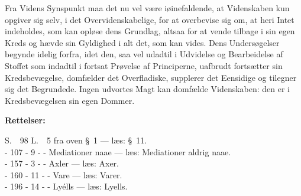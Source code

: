 \documentclass[12pt]{book}
\begin{document}
Fra Videns Synspunkt maa det nu vel være iøinefaldende, at Videnskaben kun
opgiver sig selv, i det Overvidenskabelige, for at overbevise sig om, at heri
Intet indeholdes, som kan opløse dens Grundlag, altsaa for at vende tilbage i
sin egen Kreds og hævde sin Gyldighed i alt det, som kan vides. Dens
Undersøgelser begynde idelig forfra, idet den, saa vel udadtil i Udvidelse og
Bearbeidelse af Stoffet som indadtil i fortsat Prøvelse af Principerne,
uafbrudt fortsætter sin Kredsbevægelse, domfælder det Overfladiske, supplerer
det Eensidige og tilegner sig det Begrundede. Ingen udvortes Magt kan domfælde
Videnskaben: den er i Kredsbevægelsen sin egen Dommer.

\bigskip

{\footnotesize
\begin{center}\textbf{Rettelser:}\end{center}
\noindent
S.\ \ 98 L.\ \ 5 fra oven §\ 1 --- læs: §\ 11.\\
- 107 - 9 - - Mediationer naae --- læs: Mediationer aldrig naae.\\
- 157 - 3 - - Axler --- læs: Axer.\\
- 160 - 11 - - Vare --- læs: Varer.\\
- 196 - 14 - - Lyélls --- læs: Lyells.\par}
\end{document}
